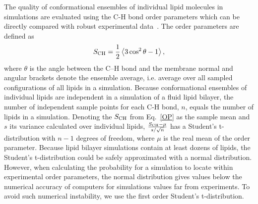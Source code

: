 \documentclass[fleqn,10pt]{wlscirep}
\begin{document}
The quality of conformational ensembles of individual lipid molecules in simulations are evaluated using the C-H bond order parameters which can be directly compared with robust experimental data~\cite{ollila16}.
The order parameters are defined as
\begin{equation}\label{OP}
S_{\rm CH}=\frac{1}{2}\left\langle 3\cos^2\theta -1 \right\rangle,
\end{equation}
where $\theta$ is the angle between the C--H bond and the membrane normal
and angular brackets denote the ensemble average, i.e. average over all sampled configurations of all lipids in a simulation.
Because conformational ensembles of individual lipids are independent in a simulation of a fluid lipid bilayer, the number of independent sample points for each C-H bond, $n$, equals the number of lipids in a simulation. Denoting the $S_{\rm CH}$ from Eq.~\ref{OP} as the sample mean and $s$ its variance calculated over individual lipids, 
$\frac{S_{\rm CH}-\mu}{s/\sqrt{n}}$
has a Student's t-distribution with $n-1$ degrees of freedom, where $\mu$ is the real mean of the order parameter. 
Because lipid bilayer simulations contain at least dozens of lipids, the Student's t-distribution could be safely approximated with a normal distribution. However, when calculating the probability for a simulation to locate within experimental order parameters, the normal distribution gives values below the numerical accuracy of computers for simulations values far from experiments. To avoid such numerical instability, we use the first order Student's t-distribution.%
\end{document}
